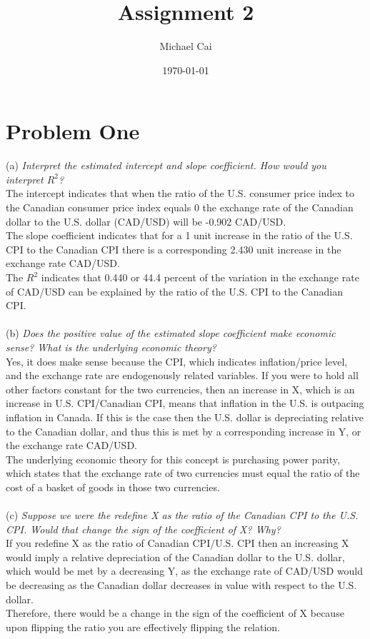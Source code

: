 \documentclass[11pt, oneside]{article}   	%
\title{Assignment 2}
\author{Michael Cai}
\date{\today}							%
\begin{document}
\maketitle
\section{Problem One}
(a) \textit{Interpret the estimated intercept and slope coefficient. How would you interpret $R^2$?}\\
The intercept indicates that when the ratio of the U.S. consumer price index to the Canadian consumer price index equals 0 the exchange rate of the Canadian dollar to the U.S. dollar (CAD/USD) will be -0.902 CAD/USD.\\
The slope coefficient indicates that for a 1 unit increase in the ratio of the U.S. CPI to the Canadian CPI there is a corresponding 2.430 unit increase in the exchange rate CAD/USD.\\
The $R^2$ indicates that 0.440 or 44.4 percent of the variation in the exchange rate of CAD/USD can be explained by the ratio of the U.S. CPI to the Canadian CPI.\\~\\
(b) \textit{Does the positive value of the estimated slope coefficient make economic sense? What is the underlying economic theory?}\\
Yes, it does make sense because the CPI, which indicates inflation/price level, and the exchange rate are endogenously related variables. If you were to hold all other factors constant for the two currencies, then an increase in X, which is an increase in U.S. CPI/Canadian CPI, means that inflation in the U.S. is outpacing inflation in Canada. If this is the case then the U.S. dollar is depreciating relative to the Canadian dollar, and thus this is met by a corresponding increase in Y, or the exchange rate CAD/USD.\\
The underlying economic theory for this concept is purchasing power parity, which states that the exchange rate of two currencies must equal the ratio of the cost of a basket of goods in those two currencies.\\~\\
(c) \textit{Suppose we were the redefine X as the ratio of the Canadian CPI to the U.S. CPI. Would that change the sign of the coefficient of X? Why?}\\
If you redefine X as the ratio of Canadian CPI/U.S. CPI then an increasing X would imply a relative depreciation of the Canadian dollar to the U.S. dollar, which would be met by a decreasing Y, as the exchange rate of CAD/USD would be decreasing as the Canadian dollar decreases in value with respect to the U.S. dollar.\\
Therefore, there would be a change in the sign of the coefficient of X because upon flipping the ratio you are effectively flipping the relation.\\
\end{document}
